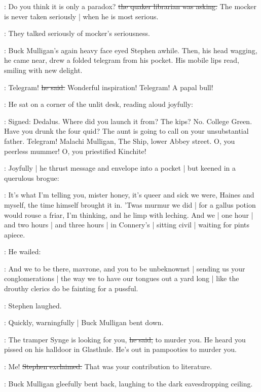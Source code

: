 \librarian:
Do you think it is only a paradox?
\sout{the quaker librarian was asking.}
The mocker is never taken seriously |
when he is most serious.

:
They talked seriously of mocker's seriousness.

:
Buck Mulligan's again heavy face eyed Stephen awhile.
Then,
his head wagging,
he came near,
drew a folded telegram from his pocket.
His mobile lips read,
smiling with new delight.

\mulligan:
Telegram!
\sout{he said.}
Wonderful inspiration!
Telegram!
A papal bull!

:
He sat on a corner of the unlit desk,
reading aloud joyfully:

\mulligan:
Signed: Dedalus.
Where did you launch it from?
The kips?
No.
College Green.
Have you drunk the four quid?
The aunt is going to call on your unsubstantial father.
Telegram!
Malachi Mulligan, The Ship, lower Abbey street.
O, you peerless mummer!
O, you priestified Kinchite!

:
Joyfully |
he thrust message and envelope into a pocket |
but keened in a querulous brogue:

\mulligan:
It's what I'm telling you,
mister honey,
it's queer and sick we were,
Haines and myself,
the time himself brought it in.
'Twas murmur we did |
for a gallus potion would rouse a friar,
I'm thinking,
and he limp with leching.
And we |
one hour |
and two hours |
and three hours |
in Connery's |
sitting civil |
waiting for pints apiece.

:
He wailed:

\mulligan:
And we to be there,
mavrone,
and you to be unbeknownst |
sending us your conglomerations |
the way we to have our tongues out a yard long |
like the drouthy clerics do be fainting for a pussful.

:
Stephen laughed.

:
Quickly, warningfully |
Buck Mulligan bent down.

\mulligan:
The tramper Synge is looking for you,
\sout{he said,}
to murder you.
He heard you pissed on his halldoor in Glasthule.
He's out in pampooties to murder you.

\Stephen:
Me!
\sout{Stephen exclaimed.}
That was your contribution to literature.

:
Buck Mulligan gleefully bent back,
laughing to the dark eavesdropping ceiling.


